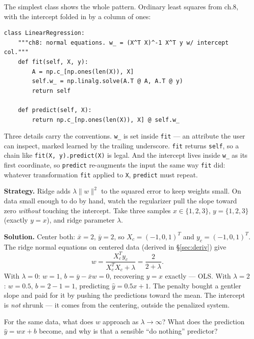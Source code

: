 The simplest class shows the whole pattern. Ordinary least squares
from ch.8, with the intercept folded in by a column of ones:

\begin{lstlisting}[caption={\ttfamily from code/mlscratch.py ---
the LinearRegression class}]
class LinearRegression:
    """ch8: normal equations. w_ = (X^T X)^-1 X^T y w/ intercept col."""
    def fit(self, X, y):
        A = np.c_[np.ones(len(X)), X]
        self.w_ = np.linalg.solve(A.T @ A, A.T @ y)
        return self

    def predict(self, X):
        return np.c_[np.ones(len(X)), X] @ self.w_
\end{lstlisting}

Three details carry the conventions. \texttt{w\_} is set inside
\texttt{fit} --- an attribute the user can inspect, marked learned
by the trailing underscore. \texttt{fit} returns \texttt{self}, so a chain like
\texttt{fit(X, y).predict(X)} is legal. And the
intercept lives inside \texttt{w\_} as its first coordinate, so
\texttt{predict} re-augments the input the same way \texttt{fit}
did: whatever transformation \texttt{fit} applied to \texttt{X},
\texttt{predict} must repeat.

\begin{example}\label{ex:ridgehand}
\textbf{Strategy.} Ridge adds $\lambda\|w\|^2$ to the squared error
to keep weights small. On data small enough to do by hand, watch the
regularizer pull the slope toward zero \emph{without} touching the
intercept. Take three samples $x\in\{1,2,3\}$, $y=\{1,2,3\}$
(exactly $y=x$), and ridge parameter $\lambda$.

\textbf{Solution.} Center both: $\bar x=2$, $\bar y=2$, so
$X_c=(-1,0,1)^T$ and $y_c=(-1,0,1)^T$. The ridge normal equations
on centered data (derived in \S\ref{sec:deriv}) give
\[
w=\frac{X_c^Ty_c}{X_c^TX_c+\lambda}=\frac{2}{2+\lambda}.
\]
With $\lambda=0$: $w=1$, $b=\bar y-\bar xw=0$, recovering $y=x$
exactly --- OLS. With $\lambda=2$: $w=0.5$, $b=2-1=1$, predicting
$\hat y=0.5x+1$. The penalty bought a gentler slope and paid for it
by pushing the predictions toward the mean. The intercept is
\emph{not} shrunk --- it comes from the centering, outside the
penalized system.
\end{example}

\begin{exercise}[easy]
For the same data, what does $w$ approach as
$\lambda\to\infty$? What does the prediction $\hat y=wx+b$ become,
and why is that a sensible ``do nothing'' predictor?
\end{exercise}


